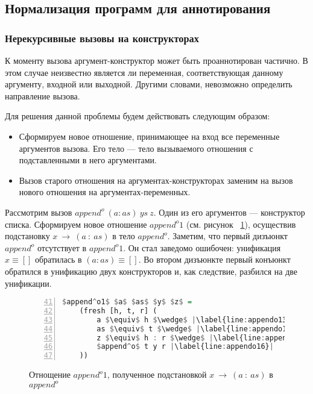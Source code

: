 \subsection{Нормализация программ для аннотирования}


\subsubsection{Нерекурсивные вызовы на конструкторах}

К моменту вызова аргумент-конструктор может быть проаннотирован частично.
В этом случае неизвестно является ли переменная, соответствующая данному аргументу, входной или выходной.
Другими словами, невозможно определить направление вызова.

Для решения данной проблемы будем действовать следующим образом:
\begin{itemize}
    \item Сформируем новое отношение, принимающее на вход все переменные аргументов вызова. Его тело --- тело вызываемого отношения с подставленными в него аргументами.
    \item Вызов старого отношения на аргументах-конструкторах заменим на вызов нового отношения на аргументах-переменных. 
\end{itemize}

Рассмотрим вызов $append^o~(a : as)~ys~z$.
Один из его аргументов --- конструктор списка.
Сформируем новое отношение $append^o1$ (см. рисунок ~\ref{lst:appendo1}), осуществив подстановку $x~\rightarrow~(a~:~as)$ в тело $append^o$.
Заметим, что первый дизъюнкт $append^o$ отсутствует в $append^o1$.
Он стал заведомо ошибочен: унификация $x \equiv []$ обратилась в $(a : as) \equiv []$.
Во втором дизъюнкте первый конъюнкт обратился в унификацию двух конструкторов и, как следствие, разбился на две унификации.

\begin{figure}[h!]
  \begin{center}
  \begin{minipage}{0.4\textwidth}
  \begin{lstlisting}[language=Haskell, frame=single, numbers=left,numberstyle=\small, firstnumber=41, escapechar=|]
  $append^o1$ $a$ $as$ $y$ $z$ =
    (fresh [h, t, r] (
        a $\equiv$ h $\wedge$ |\label{line:appendo13}|
        as $\equiv$ t $\wedge$ |\label{line:appendo14}|
        z $\equiv$ h : r $\wedge$ |\label{line:appendo15}|
        $append^o$ t y r |\label{line:appendo16}|
    ))
    \end{lstlisting}
  \end{minipage}
  \end{center}
  \caption{Отнощение $append^o1$, полученное подстановкой $x~\rightarrow~(a~:~as)$ в $append^o$}
  \label{lst:appendo1}
\end{figure}

